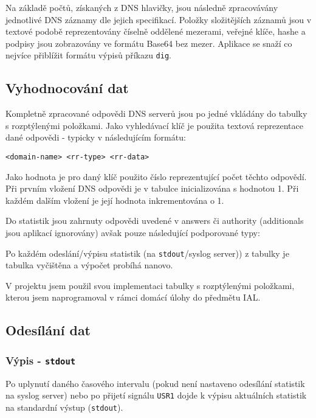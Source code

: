\documentclass[11pt]{article}
\begin{document}
	Na základě počtů, získaných z DNS hlavičky, jsou následně zpracovávány jednotlivé DNS záznamy dle jejich specifikací\cite{RFC1035,RFC4034}.
	Položky složitějších záznamů jsou v textové podobě reprezentovány číselně oddělené mezerami, veřejné klíče, hashe a podpisy jsou zobrazovány ve formátu Base64 bez mezer.
	Aplikace se snaží co nejvíce přiblížit formátu výpisů příkazu \texttt{dig}.
	
	\subsection{Vyhodnocování dat}
	Kompletně zpracované odpovědi DNS serverů jsou po jedné vkládány do tabulky s rozptýlenými položkami.
	Jako vyhledávací klíč je použita textová reprezentace dané odpovědi - typicky v následujícím formátu:
	
	\begin{verbatim}
<domain-name> <rr-type> <rr-data>
	\end{verbatim}
	
	Jako hodnota je pro daný klíč použito číslo reprezentující počet těchto odpovědí.
	Při prvním vložení DNS odpovědi je v tabulce inicializována s hodnotou 1.
	Při každém dalším vložení je její hodnota inkrementována o 1.
	
	Do statistik jsou zahrnuty odpovědi uvedené v answers či authority (additionals jsou aplikací ignorovány) avšak pouze následující podporované typy:
	
	
	Po každém odeslání/výpisu statistik (na \texttt{stdout}/syslog server)) z tabulky je tabulka vyčištěna a výpočet probíhá nanovo.
	
	V projektu jsem použil svou implementaci tabulky s rozptýlenými položkami, kterou jsem naprogramoval v rámci domácí úlohy do předmětu IAL.
	
	
	\subsection{Odesílání dat} \label{section:data-sending}
	\subsubsection{Výpis - \texttt{stdout}}
	Po uplynutí daného časového intervalu (pokud není nastaveno odesílání statistik na syslog server) nebo po přijetí signálu \texttt{USR1} dojde k výpisu aktuálních statistik na standardní výstup (\texttt{stdout}).
	
\end{document}
